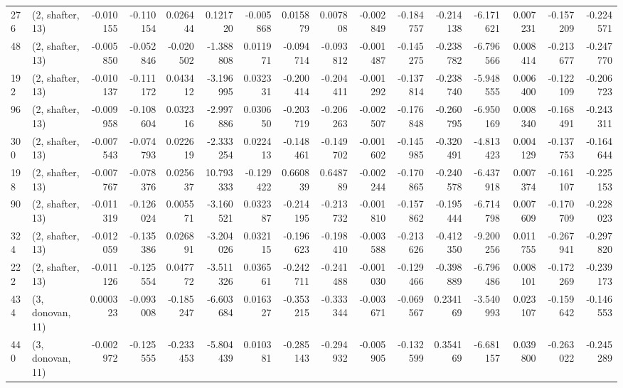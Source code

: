 \begin{tabular}{llrrrrrrrrrrrrrr}
276 &  (2, shafter, 13) &  -0.010155 & -0.110154 &  0.026444 &     0.121720 &  -0.005868 &   0.015879 &   0.007808 & -0.002849 & -0.184757 & -0.214138 &   -6.171621 &  0.007231 & -0.157209 & -0.224571 \\
48  &  (2, shafter, 13) &  -0.005850 & -0.052846 & -0.020502 &    -1.388808 &   0.011971 &  -0.094714 &  -0.093812 & -0.001487 & -0.145275 & -0.238782 &   -6.796566 &  0.008414 & -0.213677 & -0.247770 \\
192 &  (2, shafter, 13) &  -0.010137 & -0.111172 &  0.043412 &    -3.196995 &   0.032331 &  -0.200414 &  -0.204411 & -0.001292 & -0.137814 & -0.238740 &   -5.948555 &  0.006400 & -0.122109 & -0.206723 \\
96  &  (2, shafter, 13) &  -0.009958 & -0.108604 &  0.032316 &    -2.997886 &   0.030650 &  -0.203719 &  -0.206263 & -0.002507 & -0.176848 & -0.260795 &   -6.950169 &  0.008340 & -0.168491 & -0.243311 \\
300 &  (2, shafter, 13) &  -0.007543 & -0.074793 &  0.022619 &    -2.333254 &   0.022413 &  -0.148461 &  -0.149702 & -0.001602 & -0.145985 & -0.320491 &   -4.813423 &  0.004129 & -0.137753 & -0.164644 \\
198 &  (2, shafter, 13) &  -0.007767 & -0.078376 &  0.025637 &    10.793333 &  -0.129422 &   0.660839 &   0.648789 & -0.002244 & -0.170865 & -0.240578 &   -6.437918 &  0.007374 & -0.161107 & -0.225153 \\
90  &  (2, shafter, 13) &  -0.011319 & -0.126024 &  0.005571 &    -3.160521 &   0.032387 &  -0.214195 &  -0.213732 & -0.001810 & -0.157862 & -0.195444 &   -6.714798 &  0.007609 & -0.170709 & -0.228023 \\
324 &  (2, shafter, 13) &  -0.012059 & -0.135386 &  0.026891 &    -3.204026 &   0.032115 &  -0.196623 &  -0.198410 & -0.003588 & -0.213626 & -0.412350 &   -9.200256 &  0.011755 & -0.267941 & -0.297820 \\
222 &  (2, shafter, 13) &  -0.011126 & -0.125554 &  0.047772 &    -3.511326 &   0.036561 &  -0.242711 &  -0.241488 & -0.001030 & -0.129466 & -0.398889 &   -6.796486 &  0.008101 & -0.172269 & -0.239173 \\
434 &  (3, donovan, 11) &   0.000323 & -0.093008 & -0.185247 &    -6.603684 &   0.016327 &  -0.353215 &  -0.333344 & -0.003671 & -0.069567 &  0.234169 &   -3.540993 &  0.023107 & -0.159642 & -0.146553 \\
440 &  (3, donovan, 11) &  -0.002972 & -0.125555 & -0.233453 &    -5.804439 &   0.010381 &  -0.285143 &  -0.294932 & -0.005905 & -0.132599 &  0.354169 &   -6.681157 &  0.039800 & -0.263022 & -0.245289 \\

\end{tabular}
